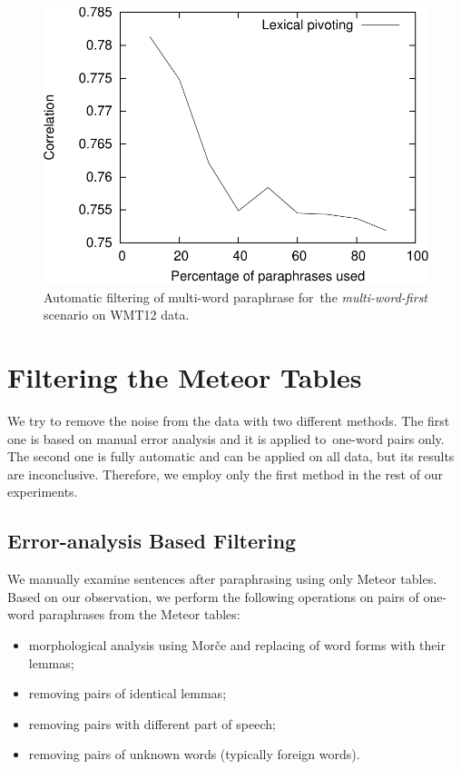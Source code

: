 \begin{figure}[ht]
\begin{center}
\includegraphics[scale=0.55]{../img/filtering-mwe-cropped.pdf}
\caption{Automatic filtering of multi-word paraphrase for~the \textit{multi-word-first} scenario on WMT12 data.}
\label{fig:filtering-mwe}
\end{center}
\end{figure}

\section{Filtering the Meteor Tables}
\label{filtering-section}

We try to remove the noise from the data with two different methods. The first
one is based on manual error analysis and it is applied to~one-word pairs only.
The second one is fully automatic and can be applied on all data, but its 
results are inconclusive. Therefore, we employ only the first method in the rest 
of our experiments.

\subsection{Error-analysis Based Filtering}
We manually examine sentences after paraphrasing using only Meteor tables. 
Based on our observation, we perform the following operations on pairs of 
one-word paraphrases from the Meteor tables:

\begin{itemize}
\item morphological analysis using Morče \citep{morce:2007} and replacing of 
word forms with their lemmas; 
\item removing pairs of identical lemmas;
\item removing pairs with different part of speech;
\item removing pairs of unknown words (typically foreign words).
\end{itemize}

